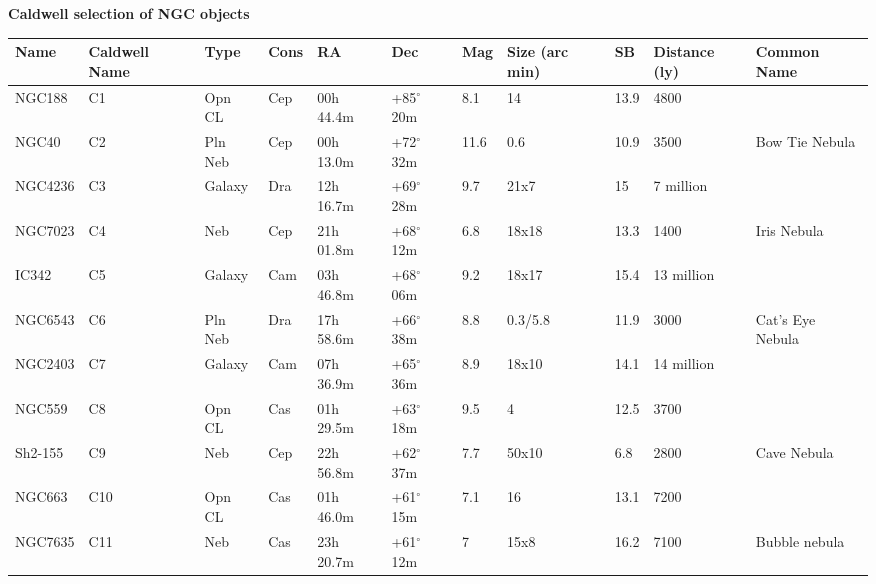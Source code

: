 \documentclass[10pt,twoside,a4paper,english]{article}
\begin{document}
 
 
 
\clearpage 
\hspace{6 mm} 
{\bf Caldwell selection of NGC objects}  
\begin{longtable}{@{}lllllllllll@{}} 
\hline 
{\bf Name} & {\bf Caldwell Name} & {\bf Type} & {\bf Cons} & {\bf RA}  & {\bf Dec} & {\bf Mag} & {\bf Size (arc min)} & {\bf SB} & {\bf Distance (ly)} & {\bf Common Name}               \\ 
\hline 
NGC188     & C1            & Opn CL  & Cep & 00h 44.4m & +85$^{\circ}$ 20m & 8.1  & 14             & 13.9 & 4800          &                                 \\ 
NGC40      & C2            & Pln Neb & Cep & 00h 13.0m & +72$^{\circ}$ 32m & 11.6 & 0.6            & 10.9 & 3500          & Bow Tie Nebula                  \\ 
NGC4236    & C3            & Galaxy  & Dra & 12h 16.7m & +69$^{\circ}$ 28m & 9.7  & 21x7           & 15   & 7 million     &                                 \\ 
NGC7023    & C4            & Neb     & Cep & 21h 01.8m & +68$^{\circ}$ 12m & 6.8  & 18x18          & 13.3 & 1400          & Iris Nebula                     \\ 
IC342      & C5            & Galaxy  & Cam & 03h 46.8m & +68$^{\circ}$ 06m & 9.2  & 18x17          & 15.4 & 13 million    &                                 \\ 
NGC6543    & C6            & Pln Neb & Dra & 17h 58.6m & +66$^{\circ}$ 38m & 8.8  & 0.3/5.8        & 11.9 & 3000          & Cat's Eye Nebula                \\ 
NGC2403    & C7            & Galaxy  & Cam & 07h 36.9m & +65$^{\circ}$ 36m & 8.9  & 18x10          & 14.1 & 14 million    &                                 \\ 
NGC559     & C8            & Opn CL  & Cas & 01h 29.5m & +63$^{\circ}$ 18m & 9.5  & 4              & 12.5 & 3700          &                                 \\ 
Sh2-155    & C9            & Neb     & Cep & 22h 56.8m & +62$^{\circ}$ 37m & 7.7  & 50x10          & 6.8  & 2800          & Cave Nebula                     \\ 
NGC663     & C10           & Opn CL  & Cas & 01h 46.0m & +61$^{\circ}$ 15m & 7.1  & 16             & 13.1 & 7200          &                                 \\ 
NGC7635    & C11           & Neb     & Cas & 23h 20.7m & +61$^{\circ}$ 12m & 7    & 15x8           & 16.2 & 7100          & Bubble nebula                   \\ 

\end{longtable}
\end{document}
